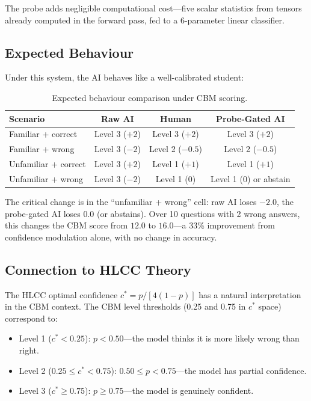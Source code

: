 \documentclass[11pt,a4paper]{article}
\begin{document}
The probe adds negligible computational cost---five scalar statistics from tensors already computed in the forward pass, fed to a 6-parameter linear classifier.

\subsection{Expected Behaviour}

Under this system, the AI behaves like a well-calibrated student:

\begin{table}[H]
\centering
\caption{Expected behaviour comparison under CBM scoring.}
\label{tab:behaviour}
\begin{tabular}{lccc}
\toprule
\textbf{Scenario} & \textbf{Raw AI} & \textbf{Human} & \textbf{Probe-Gated AI} \\
\midrule
Familiar + correct & Level 3 ($+2$) & Level 3 ($+2$) & Level 3 ($+2$) \\
Familiar + wrong & Level 3 ($-2$) & Level 2 ($-0.5$) & Level 2 ($-0.5$) \\
Unfamiliar + correct & Level 3 ($+2$) & Level 1 ($+1$) & Level 1 ($+1$) \\
Unfamiliar + wrong & Level 3 ($-2$) & Level 1 ($0$) & Level 1 ($0$) or abstain \\
\bottomrule
\end{tabular}
\end{table}

The critical change is in the ``unfamiliar + wrong'' cell: raw AI loses $-2.0$, the probe-gated AI loses $0.0$ (or abstains).
Over 10 questions with 2 wrong answers, this changes the CBM score from $12.0$ to $16.0$---a 33\% improvement from confidence modulation alone, with no change in accuracy.

\subsection{Connection to HLCC Theory}

The HLCC optimal confidence $c^* = p/[4(1-p)]$ has a natural interpretation in the CBM context.
The CBM level thresholds (0.25 and 0.75 in $c^*$ space) correspond to:
\begin{itemize}
    \item Level 1 ($c^* < 0.25$): $p < 0.50$---the model thinks it is more likely wrong than right.
    \item Level 2 ($0.25 \leq c^* < 0.75$): $0.50 \leq p < 0.75$---the model has partial confidence.
    \item Level 3 ($c^* \geq 0.75$): $p \geq 0.75$---the model is genuinely confident.
\end{itemize}
\end{document}
